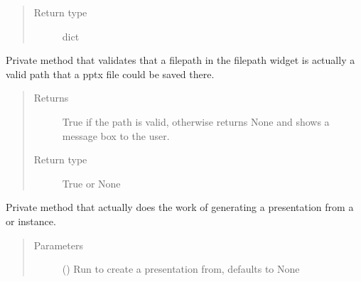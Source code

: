 \documentclass[letterpaper,10pt,english]{sphinxmanual}
\begin{document}
\begin{fulllineitems}
\begin{fulllineitems}
\begin{quote}
\begin{description}
\item[{Return type}] \leavevmode
dict

\end{description}\end{quote}

\end{fulllineitems}


\begin{fulllineitems}
\label{\detokenize{polo.windows:polo.windows.pptx_dialog.PptxDesignerDialog._validate_typed_path}}
Private method that validates that a filepath in the filepath
 widget is actually a valid path that a pptx file could be
saved there.
\begin{quote}\begin{description}
\item[{Returns}] \leavevmode
True if the path is valid, otherwise returns None and shows
a message box to the user.

\item[{Return type}] \leavevmode
True or None

\end{description}\end{quote}

\end{fulllineitems}


\begin{fulllineitems}
\label{\detokenize{polo.windows:polo.windows.pptx_dialog.PptxDesignerDialog._write_presentation}}
Private method that actually does the work of generating a
presentation from a  or  instance.
\begin{quote}\begin{description}
\item[{Parameters}] \leavevmode
{} ({\hyperref[\detokenize{polo.crystallography:polo.crystallography.run.Run}]{}}\sphinxstyleliteralemphasis{\sphinxupquote{, }}) \textendash{} Run to create a presentation from, defaults to None


\end{description}
\end{quote}
\end{fulllineitems}
\end{fulllineitems}
\end{document}
